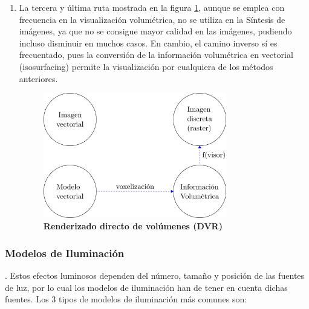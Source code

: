 \begin{enumerate}
     \item La tercera y última ruta mostrada en la figura \ref{fig:grafica6}, aunque se emplea con frecuencia en la visualización volumétrica, no se utiliza en la Síntesis de imágenes, ya que no se consigue mayor calidad en las imágenes, pudiendo incluso disminuir en muchos casos. En cambio, el camino inverso sí es frecuentado, pues la conversión de la información volumétrica en vectorial (isosurfacing) permite la visualización por cualquiera de los métodos anteriores.
    
    \begin{figure}[h]
    \includegraphics[width=8cm]{Img/CPD/grafica6.png}
    \centering
    \caption{\textbf{\footnotesize{Renderizado directo de volúmenes (DVR)}}}
    \label{fig:grafica6}
    \end{figure}
\end{enumerate}

\subsubsection{Modelos de Iluminación}
 \citep{Ramos2011}. Estos efectos luminosos dependen del número, tamaño y posición de las fuentes de luz, por lo cual los modelos de iluminación han de tener en cuenta dichas fuentes. Los 3 tipos de modelos de iluminación más comunes son:


